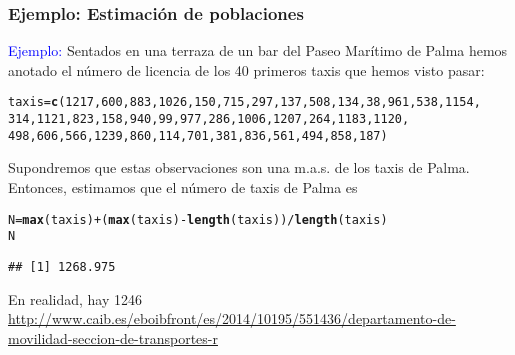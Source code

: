 \documentclass[12pt,t]{beamer}\usepackage[]{graphicx}\usepackage[]{color}
\makeatletter
\newcommand{\hlnum}[1]{\textcolor[rgb]{0.686,0.059,0.569}{#1}}%
\newcommand{\hlopt}[1]{\textcolor[rgb]{0,0,0}{#1}}%
\newcommand{\hlstd}[1]{\textcolor[rgb]{0.345,0.345,0.345}{#1}}%
\newcommand{\hlkwb}[1]{\textcolor[rgb]{0.69,0.353,0.396}{#1}}%
\newcommand{\hlkwd}[1]{\textcolor[rgb]{0.737,0.353,0.396}{\textbf{#1}}}%
\newenvironment{kframe}{%
 \def\at@end@of@kframe{}%
 \ifinner\ifhmode%
  \def\at@end@of@kframe{\end{minipage}}%
  \begin{minipage}{\columnwidth}%
 \fi\fi%
 \def\FrameCommand##1{\hskip\@totalleftmargin \hskip-\fboxsep
 \colorbox{shadecolor}{##1}\hskip-\fboxsep
     \hskip-\linewidth \hskip-\@totalleftmargin \hskip\columnwidth}%
 \MakeFramed {\advance\hsize-\width
   \@totalleftmargin\z@ \linewidth\hsize
   \@setminipage}}%
 {\par\unskip\endMakeFramed%
 \at@end@of@kframe}
\newenvironment{knitrout}{}{} %
\newcommand{\blue}[1]{\textcolor{blue}{#1}}
\theoremstyle{plain}
\theoremstyle{definition}
\makeatother
\begin{document}
\begin{frame}[fragile]
\frametitle{Ejemplo: Estimación de poblaciones }
\vspace*{-2ex}

\blue{Ejemplo:}
Sentados en una terraza de un bar del Paseo Marítimo de Palma hemos anotado el número de licencia de los 40 primeros taxis que hemos visto pasar:
\vspace*{-1ex}


\begin{knitrout}\scriptsize
{}\color{fgcolor}\begin{kframe}
\begin{alltt}
\hlstd{taxis}\hlkwb{=}\hlkwd{c}\hlstd{(}\hlnum{1217}\hlstd{,}\hlnum{600}\hlstd{,}\hlnum{883}\hlstd{,}\hlnum{1026}\hlstd{,}\hlnum{150}\hlstd{,}\hlnum{715}\hlstd{,}\hlnum{297}\hlstd{,}\hlnum{137}\hlstd{,}\hlnum{508}\hlstd{,}\hlnum{134}\hlstd{,}\hlnum{38}\hlstd{,}\hlnum{961}\hlstd{,}\hlnum{538}\hlstd{,}\hlnum{1154}\hlstd{,}
        \hlnum{314}\hlstd{,}\hlnum{1121}\hlstd{,}\hlnum{823}\hlstd{,}\hlnum{158}\hlstd{,}\hlnum{940}\hlstd{,}\hlnum{99}\hlstd{,}\hlnum{977}\hlstd{,}\hlnum{286}\hlstd{,}\hlnum{1006}\hlstd{,}\hlnum{1207}\hlstd{,}\hlnum{264}\hlstd{,}\hlnum{1183}\hlstd{,}\hlnum{1120}\hlstd{,}
        \hlnum{498}\hlstd{,}\hlnum{606}\hlstd{,}\hlnum{566}\hlstd{,}\hlnum{1239}\hlstd{,}\hlnum{860}\hlstd{,}\hlnum{114}\hlstd{,}\hlnum{701}\hlstd{,}\hlnum{381}\hlstd{,}\hlnum{836}\hlstd{,}\hlnum{561}\hlstd{,}\hlnum{494}\hlstd{,}\hlnum{858}\hlstd{,}\hlnum{187}\hlstd{)}
\end{alltt}
\end{kframe}
\end{knitrout}

\vspace*{-1ex}

Supondremos que estas observaciones son  una m.a.s. de los taxis de Palma. Entonces, estimamos  que el número de taxis de Palma es
\vspace*{-1ex}
\begin{knitrout}\scriptsize
{}\color{fgcolor}\begin{kframe}
\begin{alltt}
\hlstd{N}\hlkwb{=}\hlkwd{max}\hlstd{(taxis)}\hlopt{+}\hlstd{(}\hlkwd{max}\hlstd{(taxis)}\hlopt{-}\hlkwd{length}\hlstd{(taxis))}\hlopt{/}\hlkwd{length}\hlstd{(taxis)}
\hlstd{N}
\end{alltt}
\begin{verbatim}
## [1] 1268.975
\end{verbatim}
\end{kframe}
\end{knitrout}
\vspace*{-1ex}
En realidad, hay  1246 
\medskip
{\tiny \url{http://www.caib.es/eboibfront/es/2014/10195/551436/departamento-de-movilidad-seccion-de-transportes-r}
}
\end{frame}
\end{document}
